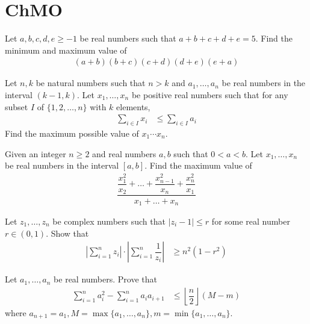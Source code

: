 \documentclass{subfile}
\begin{document}
	\section{ChMO}\label{sec:chmo}
	
		\begin{problem}[$2019$, problem $1$]
			Let $a,b,c,d,e\geq-1$ be real numbers such that $a+b+c+d+e=5$. Find the minimum and maximum value of
				\begin{align*}
					(a+b)(b+c)(c+d)(d+e)(e+a)
				\end{align*}
		\end{problem}
	
		\begin{problem}[$2018$, problem $6$]
			Let $n,k$ be natural numbers such that $n>k$ and $a_{1},\ldots,a_{n}$ be real numbers in the interval $(k-1,k)$. Let $x_{1},\ldots,x_{n}$ be positive real numbers such that for any subset $I$ of $\{1,2,\ldots,n\}$ with $k$ elements,
				\begin{align*}
					\sum_{i\in I}x_{i}
						& \leq\sum_{i\in I}a_{i}
				\end{align*}
			Find the maximum possible value of $x_{1}\cdots x_{n}$.
		\end{problem}
	
		\begin{problem}[$2017$, problem $6$]
			Given an integer $n\geq2$ and real numbers $a,b$ such that $0 < a < b$. Let $x_{1},\ldots,x_{n}$ be real numbers in the interval $[a,b]$. Find the maximum value of
				\begin{align*}
					\dfrac{\dfrac{x_{1}^{2}}{x_{2}}+\ldots+\dfrac{x_{n-1}^{2}}{x_{n}}+\dfrac{x_{n}^{2}}{x_{1}}}{x_{1}+\ldots+x_{n}}
				\end{align*}
		\end{problem}
	
		\begin{problem}[$2015$, problem $1$]
			Let $z_{1},\ldots,z_{n}$ be complex numbers such that $|z_{i}-1|\leq r$ for some real number $r\in(0,1)$. Show that
				\begin{align*}
					\left|\sum_{i=1}^{n}z_{i}\right|\cdot\left|\sum_{i=1}^{n}\dfrac{1}{z_{i}}\right|
						& \geq n^{2}(1-r^{2})
				\end{align*}
		\end{problem}
	
		\begin{problem}[$2011$, problem $1$]
			Let $a_{1},\ldots,a_{n}$ be real numbers. Prove that
				\begin{align*}
					\sum_{i=1}^{n}a_{i}^{2}-\sum_{i=1}^{n}a_{i}a_{i+1}
						& \leq \left\lfloor\dfrac{n}{2}\right\rfloor(M-m)
				\end{align*}
			where $a_{n+1}=a_{1},M=\max\{a_{1},\ldots,a_{n}\},m=\min\{a_{1},\ldots,a_{n}\}$.
		\end{problem}
	
\end{document}
